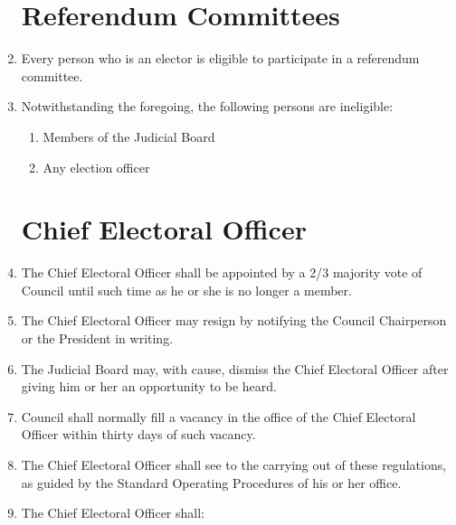 \documentclass[oneside]{book}
\begin{document}
\begin{enumerate}
\section{\label{Referendum_Committees}Referendum Committees }
\item Every person who is an elector is eligible to participate in a referendum
committee. 
\item Notwithstanding the foregoing, the following persons are ineligible: 

\begin{enumerate}
\item Members of the Judicial Board 
\item Any election officer 
\end{enumerate}
\section{\label{Chief_Electoral_Officer}Chief Electoral Officer }
\item The Chief Electoral Officer shall be appointed by a 2/3 majority vote
of Council until such time as he or she is no longer a member. 
\item The Chief Electoral Officer may resign by notifying the Council Chairperson
or the President in writing. 
\item The Judicial Board may, with cause, dismiss the Chief Electoral Officer
after giving him or her an opportunity to be heard. 
\item Council shall normally fill a vacancy in the office of the Chief Electoral
Officer within thirty days of such vacancy. 
\item The Chief Electoral Officer shall see to the carrying out of these
regulations, as guided by the Standard Operating Procedures of his or her office. 
\item The Chief Electoral Officer shall: 


\end{enumerate}
\end{document}
